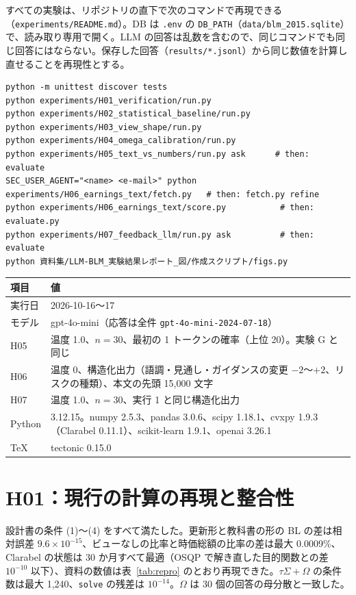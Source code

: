 \documentclass[xelatex,ja=standard,jafont=haranoaji,a4paper,10pt,openany]{bxjsreport}
\newcommand{\code}[1]{\texttt{#1}}
\newcommand{\tabref}[1]{表~\ref{#1}}
\begin{document}
すべての実験は、リポジトリの直下で次のコマンドで再現できる（\code{experiments/README.md}）。DB は \code{.env} の \code{DB\_PATH}（\code{data/blm\_2015.sqlite}）で、読み取り専用で開く。LLM の回答は乱数を含むので、同じコマンドでも同じ回答にはならない。保存した回答（\code{results/*.jsonl}）から同じ数値を計算し直せることを再現性とする。

\begin{lstlisting}[basicstyle=\ttfamily\scriptsize,frame=single,breaklines=true]
python -m unittest discover tests
python experiments/H01_verification/run.py
python experiments/H02_statistical_baseline/run.py
python experiments/H03_view_shape/run.py
python experiments/H04_omega_calibration/run.py
python experiments/H05_text_vs_numbers/run.py ask      # then: evaluate
SEC_USER_AGENT="<name> <e-mail>" python experiments/H06_earnings_text/fetch.py   # then: fetch.py refine
python experiments/H06_earnings_text/score.py           # then: evaluate.py
python experiments/H07_feedback_llm/run.py ask          # then: evaluate
python 資料集/LLM-BLM_実験結果レポート_図/作成スクリプト/figs.py
\end{lstlisting}

\begin{longtable}{p{2.6cm}p{12.3cm}}
\toprule
\textbf{項目} & \textbf{値} \\
\midrule
\endfirsthead
\bottomrule
\endfoot
実行日 & 2026-10-16〜17 \\
モデル & gpt-4o-mini（応答は全件 \code{gpt-4o-mini-2024-07-18}） \\
H05 & 温度 1.0、$n=30$、最初の 1 トークンの確率（上位 20）。実験 G と同じ \\
H06 & 温度 0、構造化出力（語調・見通し・ガイダンスの変更 $-2$〜$+2$、リスクの種類）、本文の先頭 15,000 文字 \\
H07 & 温度 1.0、$n=30$、実行 1 と同じ構造化出力 \\
Python & 3.12.15。numpy 2.5.3、pandas 3.0.6、scipy 1.18.1、cvxpy 1.9.3（Clarabel 0.11.1）、scikit-learn 1.9.1、openai 3.26.1 \\
TeX & tectonic 0.15.0 \\
\end{longtable}

\chapter{H01：現行の計算の再現と整合性}\label{ch:h01}

\begin{verdict}[判定：整合している]
設計書の条件 (1)〜(4) をすべて満たした。更新形と教科書の形の BL の差は相対誤差 $9.6\times10^{-15}$、ビューなしの比率と時価総額の比率の差は最大 0.0009\%、Clarabel の状態は 30 か月すべて最適（OSQP で解き直した目的関数との差 $10^{-10}$ 以下）、資料の数値は\tabref{tab:repro} のとおり再現できた。$\tau\Sigma+\Omega$ の条件数は最大 1,240、\code{solve} の残差は $10^{-14}$。$\Omega$ は 30 個の回答の母分散と一致した。
\end{verdict}
\end{document}
